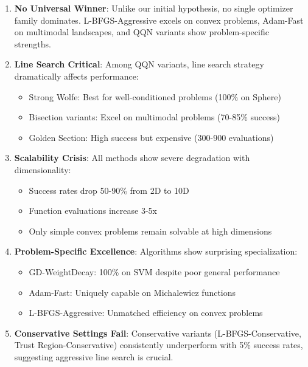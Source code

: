 \begin{enumerate}
\def\labelenumi{\arabic{enumi}.}
\item
  \textbf{No Universal Winner}: Unlike our initial hypothesis, no single optimizer family dominates. L-BFGS-Aggressive excels on convex problems, Adam-Fast on multimodal landscapes, and QQN variants show problem-specific strengths.
\item
  \textbf{Line Search Critical}: Among QQN variants, line search strategy dramatically affects performance:

  \begin{itemize}
  \tightlist
  \item
    Strong Wolfe: Best for well-conditioned problems (100\% on Sphere)
  \item
    Bisection variants: Excel on multimodal problems (70-85\% success)
  \item
    Golden Section: High success but expensive (300-900 evaluations)
  \end{itemize}
\item
  \textbf{Scalability Crisis}: All methods show severe degradation with dimensionality:

  \begin{itemize}
  \tightlist
  \item
    Success rates drop 50-90\% from 2D to 10D
  \item
    Function evaluations increase 3-5x
  \item
    Only simple convex problems remain solvable at high dimensions
  \end{itemize}
\item
  \textbf{Problem-Specific Excellence}: Algorithms show surprising specialization:

  \begin{itemize}
  \tightlist
  \item
    GD-WeightDecay: 100\% on SVM despite poor general performance
  \item
    Adam-Fast: Uniquely capable on Michalewicz functions
  \item
    L-BFGS-Aggressive: Unmatched efficiency on convex problems
  \end{itemize}
\item
  \textbf{Conservative Settings Fail}: Conservative variants (L-BFGS-Conservative, Trust Region-Conservative) consistently underperform with 5\% success rates, suggesting aggressive line search is crucial.
\end{enumerate}

